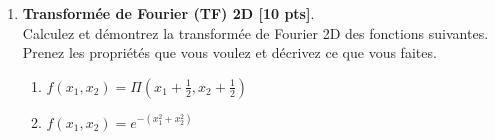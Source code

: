 \documentclass{article}
\begin{document}
\begin{enumerate}
\item {\bf Transformée de Fourier (TF) 2D [10 pts]}. \\
  Calculez et démontrez la
  transformée de Fourier 2D des 
  fonctions suivantes. Prenez les propriétés que vous voulez et
  décrivez ce que vous faites.  
  \vspace{1cm}    
  \begin{enumerate}
  \item  %
    $f(x_1, x_2) = \Pi( x_1 + \frac{1}{2}, x_2 + \frac{1}{2})$ 
    
    \vspace{1cm}    
  \item $f(x_1, x_2) = e^{-(x_1^2 + x_2^2)}$
  \end{enumerate}
  \vspace{1cm}  

\end{enumerate}
\end{document}
